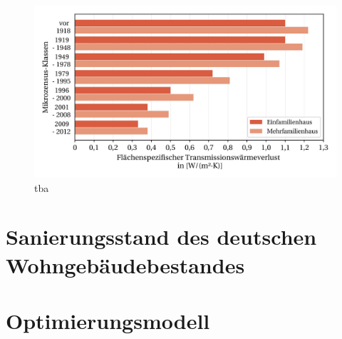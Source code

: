 \begin{figure}[H]
	\centering
		\includegraphics{Pictures/TransmissionswaermekoeffizientBaujahr.jpg}
	\caption{tba}
	\label{fig: Abbildung221} 
\end{figure}

\section{Sanierungsstand des deutschen Wohngebäudebestandes}
\label{sec:Sektion 23}


\section{Optimierungsmodell}
\label{sec:Sektion 24}



